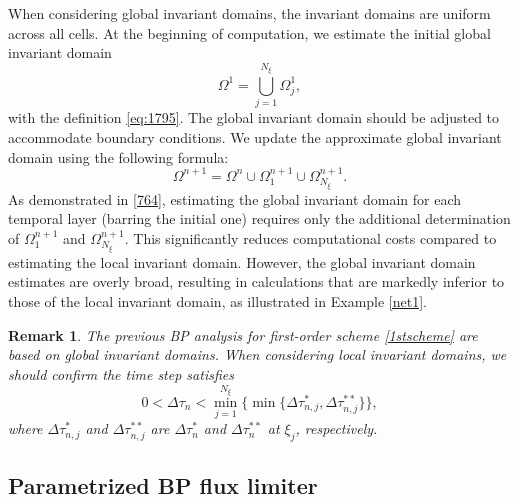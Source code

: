 \documentclass[times,final,11pt]{elsarticle}
\newtheorem{remark}{Remark}[section]
\numberwithin{equation}{section}
\theoremstyle{definition}
\theoremstyle{remark}
\begin{document}
When considering global invariant domains, the invariant domains are uniform across all cells. At the beginning of computation, we estimate the initial global invariant domain 
\begin{equation*}
	\Omega^{1} = \bigcup_{j = 1}^{N_\xi} \Omega^{1}_j,
\end{equation*}
with the definition \eqref{eq:1795}. 
The global invariant domain should be adjusted to accommodate boundary conditions. 
We update the approximate global invariant domain using the following formula:
\begin{equation}
\label{764}
	\Omega^{n + 1} = \Omega^{n} \cup \Omega^{n + 1}_{1} \cup \Omega^{n + 1}_{N_\xi}.
\end{equation}
As demonstrated in \eqref{764}, estimating the global invariant domain for each temporal layer (barring the initial one) requires only the additional determination of $\Omega^{n + 1}_{1}$ and $\Omega^{n + 1}_{N_\xi}$. This significantly reduces computational costs compared to estimating the local invariant domain. However, the global invariant domain estimates are overly broad, resulting in calculations that are markedly inferior to those of the local invariant domain, as illustrated in Example \ref{net1}.
\begin{remark}
	The previous BP analysis for first-order scheme \eqref{1stscheme} are based on global invariant domains. When considering local invariant domains, we should confirm the time step satisfies 
	\begin{equation*}
		0 < \Delta \tau_n < \min_{j = 1}^{N_\xi} \{\min \{\Delta \tau_{n,j}^*, \Delta \tau_{n,j}^{**}\}\},
	\end{equation*}
	where $\Delta \tau_{n,j}^*$ and $\Delta \tau_{n,j}^{**}$ are $\Delta \tau_{n}^*$ and $\Delta \tau_{n}^{**}$ at $\xi_j$, respectively. 
\end{remark}





\subsection{Parametrized BP flux limiter}\label{sec:1594}
\end{document}
